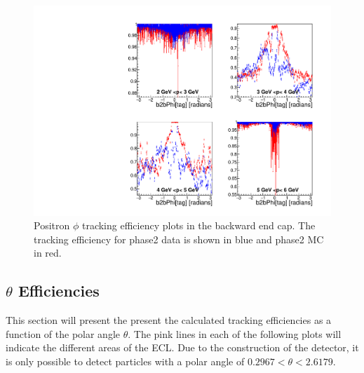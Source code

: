 \documentclass[a4paper,11pt,twosided,final,german,openbib,pdftex,listof=totoc,bibliography=totoc]{scrbook}
\begin{document}
\begin{figure}[!htbp]
	\centering
	\includegraphics[width=\textwidth]{Plots/master/xPMPhiepEC}
	\caption[Momentum $\phi$ Positron Backward End Cap Efficiency Phase2]{Positron $\phi$ tracking efficiency plots in the backward end cap. The tracking efficiency for phase2 data is shown in blue and phase2 MC in red.}
	
	\label{plt:xPMPhiepEC}
\end{figure}









\clearpage




\subsection{$\theta$ Efficiencies}

This section will present the present the calculated tracking efficiencies as a function of the polar angle $\theta$. The pink lines in each of the following plots will indicate the different areas of the ECL. Due to the construction of the detector, it is only possible to detect particles with a  polar angle of $ 0.2967 <\theta <2.6179 $.
\end{document}
